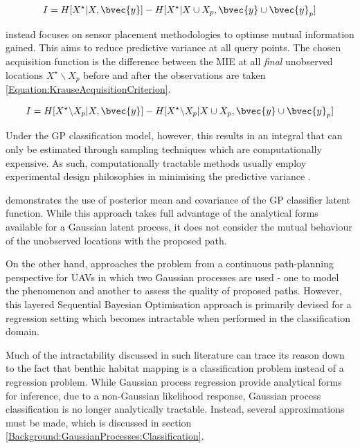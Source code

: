 			\begin{equation}
				I = H[X^{\star} | X, \bvec{y}] - H[X^{\star} | X \cup X_{p}, \bvec{y} \cup \bvec{y}_{p}]
			\label{Equation:AsherBenderMutualInformationCriterion}
			\end{equation}
			
			\cite{Krause:2008:NSP:1390681.1390689} instead focuses on sensor placement methodologies to optimse mutual information gained. This aims to reduce predictive variance at all query points. The chosen acquisition function is the difference between the MIE at all \textit{final} unobserved locations $X^{\star} \backslash X_{p}$ before and after the observations are taken \eqref{Equation:KrauseAcquisitionCriterion}.
			
			\begin{equation}
				I = H[X^{\star} \backslash X_{p} | X, \bvec{y}] - H[X^{\star} \backslash X_{p} | X \cup X_{p}, \bvec{y} \cup \bvec{y}_{p}]
			\label{Equation:KrauseAcquisitionCriterion}
			\end{equation}
			
			Under the GP classification model, however, this results in an integral that can only be estimated through sampling techniques which are computationally expensive. As such, computationally tractable methods usually employ experimental design philosophies in minimising the predictive variance \citep{AsherBender}.
			
			\cite{Kapoor} demonstrates the use of posterior mean and covariance of the GP classifier latent function. While this approach takes full advantage of the analytical forms available for a Gaussian latent process, it does not consider the mutual behaviour of the unobserved locations with the proposed path.
			
			On the other hand, \cite{Roman:SequentialBayesianOptimisation} approaches the problem from a continuous path-planning perspective for UAVs in which two Gaussian processes are used - one to model the phenomenon and another to assess the quality of proposed paths. However, this layered Sequential Bayesian Optimisation approach is primarily devised for a regression setting which becomes intractable when performed in the classification domain.
			
			Much of the intractability discussed in such literature can trace its reason down to the fact that benthic habitat mapping is a classification problem instead of a regression problem. While Gaussian process regression provide analytical forms for inference, due to a non-Gaussian likelihood response, Gaussian process classification is no longer analytically tractable. Instead, several approximations must be made, which is discussed in section \ref{Background:GaussianProcesses:Classification}.
			
